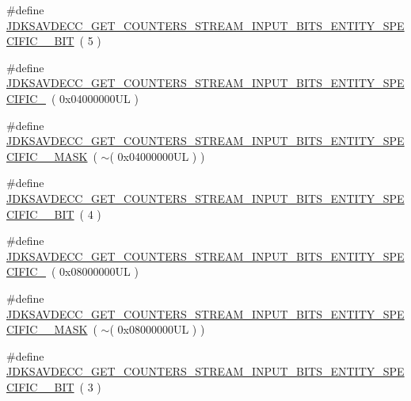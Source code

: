 \begin{DoxyCompactItemize}
\item 
\#define \hyperlink{group__get__counters__stream__input__bits_gac00deeefbdeb5907b85a465fe322ba70}{J\+D\+K\+S\+A\+V\+D\+E\+C\+C\+\_\+\+G\+E\+T\+\_\+\+C\+O\+U\+N\+T\+E\+R\+S\+\_\+\+S\+T\+R\+E\+A\+M\+\_\+\+I\+N\+P\+U\+T\+\_\+\+B\+I\+T\+S\+\_\+\+E\+N\+T\+I\+T\+Y\+\_\+\+S\+P\+E\+C\+I\+F\+I\+C\+\_\+\_\+\+B\+IT}~( 5 )
\item 
\#define \hyperlink{group__get__counters__stream__input__bits_ga78baf081065a6301ae4163bbbc7ef882}{J\+D\+K\+S\+A\+V\+D\+E\+C\+C\+\_\+\+G\+E\+T\+\_\+\+C\+O\+U\+N\+T\+E\+R\+S\+\_\+\+S\+T\+R\+E\+A\+M\+\_\+\+I\+N\+P\+U\+T\+\_\+\+B\+I\+T\+S\+\_\+\+E\+N\+T\+I\+T\+Y\+\_\+\+S\+P\+E\+C\+I\+F\+I\+C\+\_}~( 0x04000000\+U\+L )
\item 
\#define \hyperlink{group__get__counters__stream__input__bits_ga01c37edb3511badd964df7d61f98c290}{J\+D\+K\+S\+A\+V\+D\+E\+C\+C\+\_\+\+G\+E\+T\+\_\+\+C\+O\+U\+N\+T\+E\+R\+S\+\_\+\+S\+T\+R\+E\+A\+M\+\_\+\+I\+N\+P\+U\+T\+\_\+\+B\+I\+T\+S\+\_\+\+E\+N\+T\+I\+T\+Y\+\_\+\+S\+P\+E\+C\+I\+F\+I\+C\+\_\+\_\+\+M\+A\+SK}~( $\sim$( 0x04000000\+U\+L ) )
\item 
\#define \hyperlink{group__get__counters__stream__input__bits_ga5128449454de4d788711cf6698e81c6e}{J\+D\+K\+S\+A\+V\+D\+E\+C\+C\+\_\+\+G\+E\+T\+\_\+\+C\+O\+U\+N\+T\+E\+R\+S\+\_\+\+S\+T\+R\+E\+A\+M\+\_\+\+I\+N\+P\+U\+T\+\_\+\+B\+I\+T\+S\+\_\+\+E\+N\+T\+I\+T\+Y\+\_\+\+S\+P\+E\+C\+I\+F\+I\+C\+\_\+\_\+\+B\+IT}~( 4 )
\item 
\#define \hyperlink{group__get__counters__stream__input__bits_ga3777474386ddd4da1b0aea4c46d45bf8}{J\+D\+K\+S\+A\+V\+D\+E\+C\+C\+\_\+\+G\+E\+T\+\_\+\+C\+O\+U\+N\+T\+E\+R\+S\+\_\+\+S\+T\+R\+E\+A\+M\+\_\+\+I\+N\+P\+U\+T\+\_\+\+B\+I\+T\+S\+\_\+\+E\+N\+T\+I\+T\+Y\+\_\+\+S\+P\+E\+C\+I\+F\+I\+C\+\_}~( 0x08000000\+U\+L )
\item 
\#define \hyperlink{group__get__counters__stream__input__bits_ga08ae04694dbaf045e232a25fae4b0d0e}{J\+D\+K\+S\+A\+V\+D\+E\+C\+C\+\_\+\+G\+E\+T\+\_\+\+C\+O\+U\+N\+T\+E\+R\+S\+\_\+\+S\+T\+R\+E\+A\+M\+\_\+\+I\+N\+P\+U\+T\+\_\+\+B\+I\+T\+S\+\_\+\+E\+N\+T\+I\+T\+Y\+\_\+\+S\+P\+E\+C\+I\+F\+I\+C\+\_\+\_\+\+M\+A\+SK}~( $\sim$( 0x08000000\+U\+L ) )
\item 
\#define \hyperlink{group__get__counters__stream__input__bits_ga1f8eff0c5a8aecb19a1eb27a248690e5}{J\+D\+K\+S\+A\+V\+D\+E\+C\+C\+\_\+\+G\+E\+T\+\_\+\+C\+O\+U\+N\+T\+E\+R\+S\+\_\+\+S\+T\+R\+E\+A\+M\+\_\+\+I\+N\+P\+U\+T\+\_\+\+B\+I\+T\+S\+\_\+\+E\+N\+T\+I\+T\+Y\+\_\+\+S\+P\+E\+C\+I\+F\+I\+C\+\_\+\_\+\+B\+IT}~( 3 )

\end{DoxyCompactItemize}
